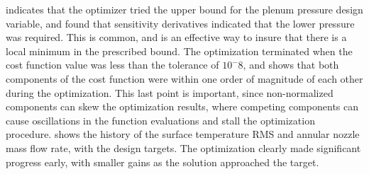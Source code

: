  indicates that the optimizer tried the upper
bound for the plenum pressure design variable, and found that sensitivity
derivatives indicated that the lower pressure was required. This is common, and
is an effective way to insure that there is a local minimum in the prescribed
bound.  The optimization terminated when the cost function value was less than
the tolerance of $10^-8$, and  shows that both
components of the cost function were within one order of magnitude of each other
during the optimization.  This last point is important, since non-normalized
components can skew the optimization results, where competing components can
cause oscillations in the function evaluations and stall the optimization
procedure.   shows the history of the surface
temperature RMS and annular nozzle mass flow rate, with the design targets.  The
optimization clearly made significant progress early, with smaller gains as the
solution approached the target.
